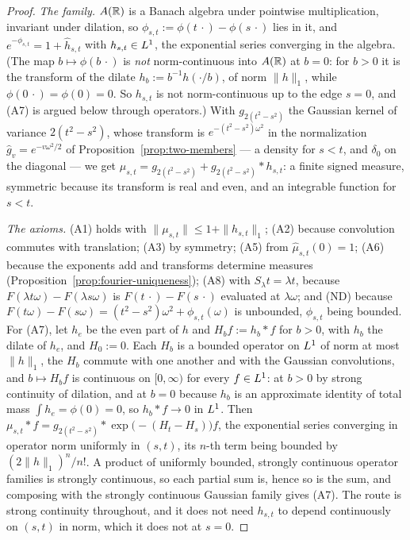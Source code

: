 \begin{proof}
\emph{The family.} $A(\mathbb{R})$ is a Banach algebra under pointwise multiplication, invariant
under dilation, so $\phi_{s,t} := \phi(t\,\cdot) - \phi(s\,\cdot)$ lies in it, and
$e^{-\phi_{s,t}} = 1 + \hat h_{s,t}$ with $h_{s,t} \in L^1$, the exponential series converging
in the algebra. (The map $b \mapsto \phi(b\,\cdot)$ is \emph{not} norm-continuous into $A(\mathbb{R})$
at $b = 0$: for $b > 0$ it is the transform of the dilate $h_b := b^{-1}h(\cdot/b)$, of norm
$\|h\|_1$, while $\phi(0\,\cdot) = \phi(0) = 0$. So $h_{s,t}$ is not norm-continuous up to the
edge $s = 0$, and (A7) is argued below through operators.) With $g_{2(t^2-s^2)}$ the
Gaussian kernel of variance $2(t^2-s^2)$, whose transform is $e^{-(t^2-s^2)\omega^2}$ in the
normalization $\hat g_v = e^{-v\omega^2/2}$ of Proposition~\ref{prop:two-members} --- a
density for $s < t$, and $\delta_0$ on the diagonal --- we get
$\mu_{s,t} = g_{2(t^2-s^2)} + g_{2(t^2-s^2)} * h_{s,t}$: a finite signed measure,
symmetric because its transform is real and even, and an integrable function for $s < t$.

\emph{The axioms.} (A1) holds with $\|\mu_{s,t}\| \le 1 + \|h_{s,t}\|_1$; (A2) because
convolution commutes with translation; (A3) by symmetry; (A5) from $\hat\mu_{s,t}(0) = 1$; (A6)
because the exponents add and transforms determine measures
(Proposition~\ref{prop:fourier-uniqueness}); (A8) with $S_\lambda t = \lambda t$, because
$F(\lambda t\omega) - F(\lambda s\omega)$ is $F(t\,\cdot) - F(s\,\cdot)$ evaluated at
$\lambda\omega$; and (ND) because
$F(t\omega) - F(s\omega) = (t^2-s^2)\omega^2 + \phi_{s,t}(\omega)$ is unbounded, $\phi_{s,t}$
being bounded. For (A7), let $h_e$ be the even part of $h$ and $H_b f := h_b * f$ for
$b > 0$, with $h_b$ the dilate of $h_e$, and $H_0 := 0$. Each $H_b$ is a bounded operator on
$L^1$ of norm at most $\|h\|_1$, the $H_b$ commute with one another and with the Gaussian
convolutions, and $b \mapsto H_b f$ is continuous on $[0,\infty)$ for every $f \in L^1$: at
$b > 0$ by strong continuity of dilation, and at $b = 0$ because $h_b$ is an approximate
identity of total mass $\int h_e = \phi(0) = 0$, so $h_b * f \to 0$ in $L^1$. Then
$\mu_{s,t} * f = g_{2(t^2-s^2)} * \exp\bigl(-(H_t - H_s)\bigr)f$, the exponential series converging in
operator norm uniformly in $(s,t)$, its $n$-th term being bounded by $(2\|h\|_1)^n/n!$. A product
of uniformly bounded, strongly continuous operator families is strongly continuous, so each
partial sum is, hence so is the sum, and composing with the strongly continuous Gaussian family
gives (A7). The route is strong continuity throughout, and it does not need $h_{s,t}$ to depend
continuously on $(s,t)$ in norm, which it does not at $s = 0$.


\end{proof}
